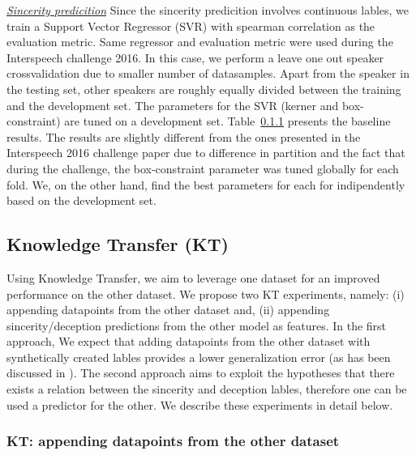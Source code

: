 \documentclass{article}
\begin{document}
\noindent\underline{\it Sincerity predicition}
Since the sincerity predicition involves continuous lables, we train a Support Vector Regressor (SVR) with spearman correlation as the evaluation metric. 
Same regressor and evaluation metric were used during the Interspeech challenge 2016.
In this case, we perform a leave one out speaker crossvalidation due to smaller number of datasamples.
Apart from the speaker in the testing set, other speakers are roughly equally divided between the training and the development set.
The parameters for the SVR (kerner and box-constraint) are tuned on a development set. 
Table~\ref{} presents the baseline results.
The results are slightly different from the ones presented in the Interspeech 2016 challenge paper \cite{} due to difference in partition and the fact that during the challenge, the box-constraint parameter was tuned globally for each fold.
We, on the other hand, find the best parameters for each for indipendently based on the development set. 

\subsection{Knowledge Transfer (KT)}
Using Knowledge Transfer, we aim to leverage one dataset for an improved performance on the other dataset.
We propose two KT experiments, namely: (i) appending datapoints from the other dataset and, (ii) appending sincerity/deception predictions from the other model as features.
In the first approach, We expect that adding datapoints from the other dataset with synthetically created lables provides a lower generalization error (as has been discussed in \cite{}). 
The second approach aims to exploit the hypotheses that there exists a relation between the sincerity and deception lables, therefore one can be used a predictor for the other.
We describe these experiments in detail below. 

\subsubsection{KT: appending datapoints from the other dataset}
\end{document}
